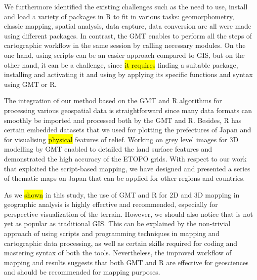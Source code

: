 \documentclass[land,article,submit,pdftex,moreauthors]{Definitions/mdpi}
\begin{document}
We furthermore identified the existing challenges\hl{ }such as the need to use, install and load a variety of packages in R to fit in various tasks: geomorphometry, classic mapping, spatial analysis, data capture, data conversion are all were made using different packages. In contrast, the GMT enables to perform all the steps of cartographic workflow in the same session by calling necessary modules. On the one hand, using scripts can be an easier approach  compared to GIS, but on the other hand, it can be a challenge, since \hl{it requires} finding a suitable package, installing and activating it and using by applying its specific functions and syntax using GMT or R. 

The integration of our method based on the GMT and R algorithms for processing various geospatial data is straightforward since many data formats can smoothly be imported and processed both by the GMT and R. Besides, R has certain embedded datasets that we used for plotting the prefectures of Japan and for visualising \hl{physical} features of relief. Working on grey level images for 3D modelling by GMT enabled to detailed the land surface features and demonstrated the high accuracy of the ETOPO grids. With respect to our work that exploited the script-based mapping, we have designed and presented a series of\hl{ }thematic maps on Japan that can be applied for other regions and countries. 

As we \hl{shown} in this study, the use of GMT and R for 2D and 3D mapping in geographic analysis is highly effective and recommended, especially for perspective visualization of the terrain. However, we should also notice that is not yet as popular as traditional GIS. This can be explained by the non-trivial approach of using scripts and programming techniques in mapping and cartographic data processing, as well as certain skills required for coding and mastering syntax of both the tools. Nevertheless, the improved workflow of mapping and results suggests that both GMT and R are effective for geosciences and should be recommended for mapping purposes.

\end{document}
